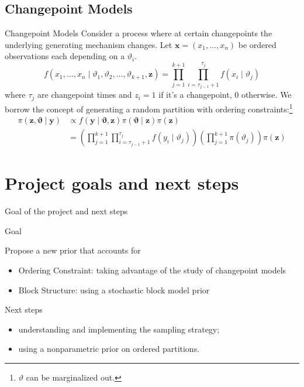 \subsection{Changepoint Models}
\begin{frame}{Changepoint Models}
    Consider a process where at certain \alert{changepoints} the underlying generating mechanism changes. Let $\bm{x}=(x_{1},\ldots,x_{n})$ be \alert{ordered} observations each depending on a $\vartheta_{i}.$
    \[
        f(x_{1},\ldots,x_{n} \mid \vartheta_1, \vartheta_2, \ldots, \vartheta_{k+1}, \bm{z})=\prod_{j=1}^{k+1} \prod_{i=\tau_{j-1}+1}^{\tau_j} f(x_i \mid \vartheta_j)
    \]
    where $\tau_j$ are changepoint times and $z_{i} = 1$ if it's a changepoint, $0$ otherwise.
    We borrow the concept of \alert{generating a random partition with ordering constraints}:\footnote{$\vartheta$ can be marginalized out.}
    \begin{align*}
        \pi(\bm{z}, \bm{\vartheta} \mid \bm{y}) & \propto f(\bm{y} \mid \bm{\vartheta}, \bm{z}) \pi(\bm{\vartheta} \mid \bm{z}) \pi(\bm{z}) \\
        &=\left(\prod_{j=1}^{k+1} \prod_{i=\tau_{j-1}+1}^{\tau_j} f(y_i \mid \vartheta_j)\right)\left(\prod_{j=1}^{k+1} \pi(\vartheta_j)\right) \pi(\bm{z})
    \end{align*}
\end{frame}








\section{Project goals and next steps}


\begin{frame}{Goal of the project and next steps}

\alert{Goal}

Propose a \alert{new prior} that accounts for
\begin{itemize}
    \item Ordering Constraint: taking advantage of the study of changepoint models
    \item Block Structure: using a stochastic block model prior
\end{itemize}
\vspace*{0.5cm}
\pause
\alert{Next steps}
\begin{itemize}
    \item understanding and implementing the sampling strategy;
    \item using a nonparametric prior on ordered partitions.
\end{itemize}

\end{frame}

